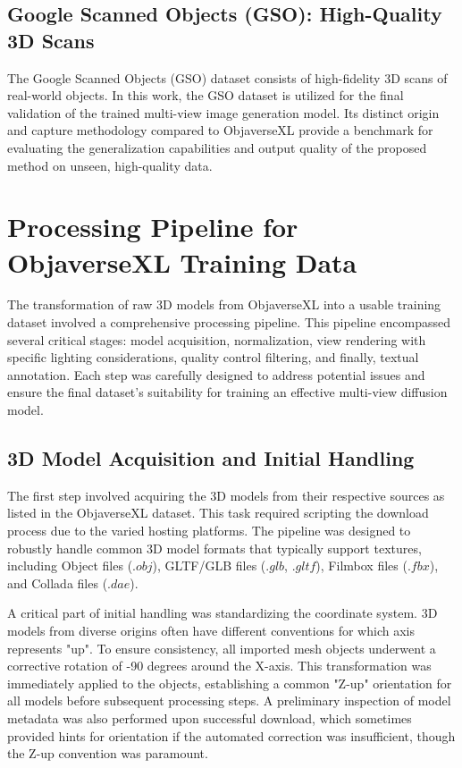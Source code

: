\subsection{Google Scanned Objects (GSO): High-Quality 3D Scans}\label{ssec:gso-overview}
The Google Scanned Objects (GSO) dataset \cite{gso} consists of high-fidelity 3D scans of real-world objects. In this work, the GSO dataset is utilized for the final validation of the trained multi-view image generation model. Its distinct origin and capture methodology compared to ObjaverseXL provide a benchmark for evaluating the generalization capabilities and output quality of the proposed method on unseen, high-quality data.

\section{Processing Pipeline for ObjaverseXL Training Data}\label{sec:objaversexl-pipeline}
The transformation of raw 3D models from ObjaverseXL into a usable training dataset involved a comprehensive processing pipeline. This pipeline encompassed several critical stages: model acquisition, normalization, view rendering with specific lighting considerations, quality control filtering, and finally, textual annotation. Each step was carefully designed to address potential issues and ensure the final dataset's suitability for training an effective multi-view diffusion model.

\subsection{3D Model Acquisition and Initial Handling}\label{ssec:model-acquisition}
The first step involved acquiring the 3D models from their respective sources as listed in the ObjaverseXL dataset. This task required scripting the download process due to the varied hosting platforms. The pipeline was designed to robustly handle common 3D model formats that typically support textures, including Object files ($.obj$), GLTF/GLB files ($.glb$, $.gltf$), Filmbox files ($.fbx$), and Collada files ($.dae$).

A critical part of initial handling was standardizing the coordinate system. 3D models from diverse origins often have different conventions for which axis represents "up". To ensure consistency, all imported mesh objects underwent a corrective rotation of -90 degrees around the X-axis. This transformation was immediately applied to the objects, establishing a common "Z-up" orientation for all models before subsequent processing steps. A preliminary inspection of model metadata was also performed upon successful download, which sometimes provided hints for orientation if the automated correction was insufficient, though the Z-up convention was paramount.

